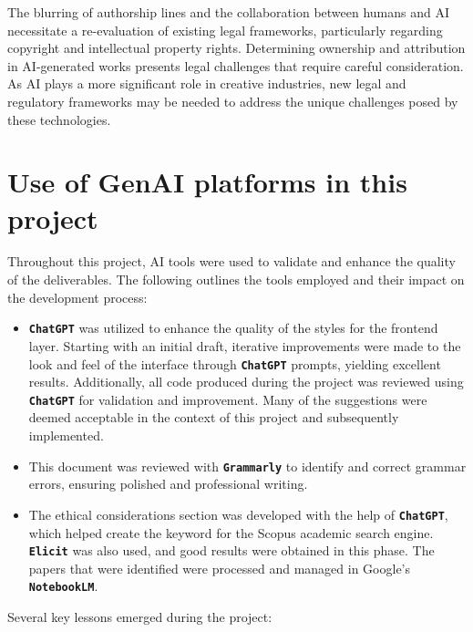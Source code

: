 \documentclass[conference]{IEEEtran}
\begin{document}
	
	The blurring of authorship lines and the collaboration between humans and AI necessitate a re-evaluation of existing legal frameworks, particularly regarding copyright and intellectual property rights\cite{kur2019european}. Determining ownership and attribution in AI-generated works presents legal challenges that require careful consideration. As AI plays a more significant role in creative industries, new legal and regulatory frameworks may be needed to address the unique challenges posed by these technologies.
	
	\section{Use of GenAI platforms in this project}
	
		
	Throughout this project, AI tools were used to validate and enhance the quality of the deliverables. The following outlines the tools employed and their impact on the development process:
	
	
	\begin{itemize}
		\item \textbf{\texttt{ChatGPT}} was utilized to enhance the quality of the styles for the frontend layer. Starting with an initial draft, iterative improvements were made to the look and feel of the interface through \textbf{\texttt{ChatGPT}} prompts, yielding excellent results. Additionally, all code produced during the project was reviewed using \textbf{\texttt{ChatGPT}} for validation and improvement. Many of the suggestions were deemed acceptable in the context of this project and subsequently implemented.
		
		\item This document was reviewed with \textbf{\texttt{Grammarly}} to identify and correct grammar errors, ensuring polished and professional writing.
		
		\item The ethical considerations section was developed with the help of \textbf{\texttt{ChatGPT}}, which helped create the keyword for the Scopus academic search engine. \textbf{\texttt{Elicit}} was also used, and good results were obtained in this phase. The papers that were identified were processed and managed in Google's \textbf{\texttt{NotebookLM}}.
	\end{itemize}

	
	Several key lessons emerged during the project:
	
\end{document}
